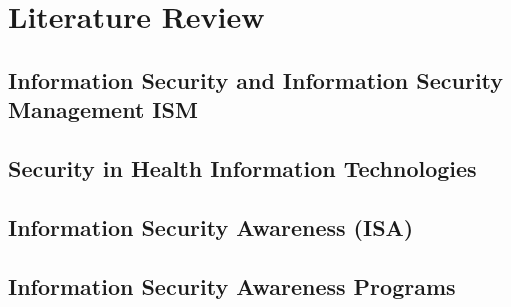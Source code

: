 \chapter{Literature Review}
\label{c:literatur}




\section{Information Security and Information Security Management ISM}
\label{c:literatur:summaries:Information Security}


\section{Security in Health Information Technologies}
\label{c:literatur:summaries:info-sec-awa-helth}


%

\section{Information Security Awareness (ISA)}
\label{c:literatur:summaries:info-sec-awa}


%

\section{Information Security Awareness Programs }
\label{c:literatur:summaries:info-sec-awa-prog}



%